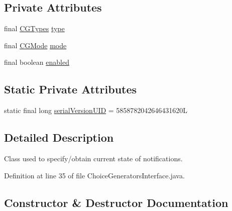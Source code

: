 \subsection*{Private Attributes}
\begin{DoxyCompactItemize}
\item 
final \hyperlink{enumgov_1_1nasa_1_1jpf_1_1inspector_1_1interfaces_1_1_choice_generators_interface_1_1_c_g_types}{C\+G\+Types} \hyperlink{classgov_1_1nasa_1_1jpf_1_1inspector_1_1interfaces_1_1_choice_generators_interface_1_1_c_g_notification_specification_abcfbe6c938f6c42eb46d8511d21c3178}{type}
\item 
final \hyperlink{enumgov_1_1nasa_1_1jpf_1_1inspector_1_1interfaces_1_1_choice_generators_interface_1_1_c_g_mode}{C\+G\+Mode} \hyperlink{classgov_1_1nasa_1_1jpf_1_1inspector_1_1interfaces_1_1_choice_generators_interface_1_1_c_g_notification_specification_a4b7b6626a07bfc4ae9914f4e506414c0}{mode}
\item 
final boolean \hyperlink{classgov_1_1nasa_1_1jpf_1_1inspector_1_1interfaces_1_1_choice_generators_interface_1_1_c_g_notification_specification_af04a49d1f2fcd7c488043190675cbcf8}{enabled}
\end{DoxyCompactItemize}
\subsection*{Static Private Attributes}
\begin{DoxyCompactItemize}
\item 
static final long \hyperlink{classgov_1_1nasa_1_1jpf_1_1inspector_1_1interfaces_1_1_choice_generators_interface_1_1_c_g_notification_specification_ae7621c78dfbdd04c7954360750e769bc}{serial\+Version\+U\+ID} = 5858782042646431620L
\end{DoxyCompactItemize}


\subsection{Detailed Description}
Class used to specify/obtain current state of notifications. 

Definition at line 35 of file Choice\+Generators\+Interface.\+java.



\subsection{Constructor \& Destructor Documentation}
